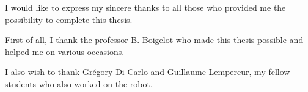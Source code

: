 	I would like to express my sincere thanks to all those who provided me the possibility to complete this thesis.

First of all, I thank the professor B. Boigelot who made this thesis possible and helped me on various occasions.

I also wish to thank Grégory Di Carlo and Guillaume Lempereur, my fellow students who also worked on the robot.